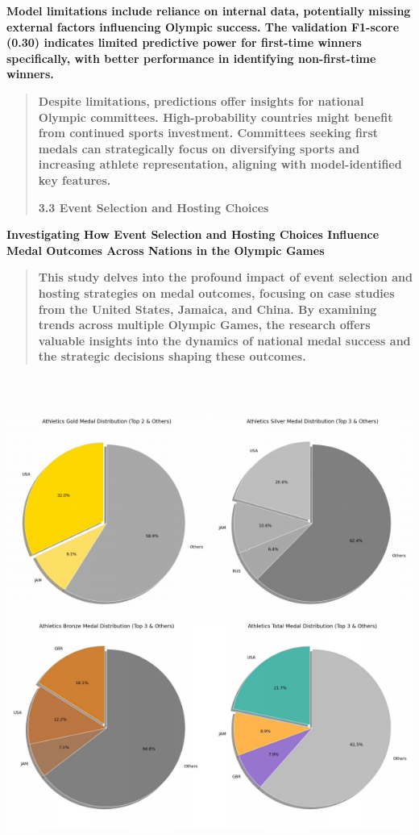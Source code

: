 \documentclass[12pt,a4paper]{article}
\renewenvironment{quote}{\begin{quotation}}{\end{quotation}}  %
\begin{document}
    \textbf{Model limitations include reliance on internal data, potentially
    missing external factors influencing Olympic success. The validation
    F1-score (0.30) indicates limited predictive power for first-time
    winners specifically, with better performance in identifying
    non-first-time winners.}
    
    \begin{quote}
    \textbf{Despite limitations, predictions offer insights for national
    Olympic committees. High-probability countries might benefit from
    continued sports investment. Committees seeking first medals can
    strategically focus on diversifying sports and increasing athlete
    representation, aligning with model-identified key features.}
    
    \protect{}\label{bookmark17-1}{}\textbf{3.3 Event Selection
    and Hosting Choices}
    \end{quote}
    
    \textbf{Investigating How Event Selection and Hosting Choices Influence
    Medal Outcomes Across Nations in the Olympic Games}
    
    \begin{quote}
    \textbf{This study delves into the profound impact of event selection
    and hosting strategies on medal outcomes, focusing on case studies from
    the United States, Jamaica, and China. By examining trends across
    multiple Olympic Games, the research offers valuable insights into the
    dynamics of national medal success and the strategic decisions shaping
    these outcomes.}
    \end{quote}
    
    \includegraphics[width=6.29833in,height=6.37833in]{./media/media/image15.png}
    
\end{document}
